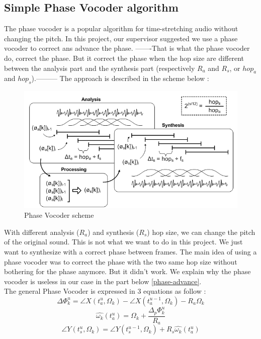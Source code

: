 \documentclass[]{article}
\begin{document}
\subsection{Simple Phase Vocoder algorithm}
The phase vocoder is a popular algorithm for time-stretching audio without changing the pitch. In this project, our supervisor suggested we use a phase vocoder to correct ans advance the phase. -------That is what the phase vocoder do, correct the phase. But it correct the phase when the hop size are different between the analysis part and the synthesis part (respectively $R_a$ and $R_s$, or $hop_a$ and $hop_s$).---------
The approach is described in the scheme below : 
\begin{figure}[H]
	\centering
	\includegraphics[scale = 0.6]{pvoverview.png}
	\caption{Phase Vocoder scheme}
\end{figure}
With different analysis ($R_a$) and synthesis ($R_s$) hop size, we can change the pitch of the original sound. This is not what we want to do in this project. We just want to synthesize with a correct phase between frames. The main idea of using a phase vocoder was to correct the phase with the two same hop size without bothering for the phase anymore. But it didn't work. We explain why the phase vocoder is useless in our case in the part below \ref{phase-advance}.\\
The general Phase Vocoder is expressed in 3 equations as follow :
\begin{equation}\label{eq1}
\Delta \Phi_{k}^{u} = \angle X(t_a^u, \Omega_k) - \angle X(t_a^{u-1}, \Omega_k) - R_a \Omega_k
\end{equation}
\begin{equation}\label{eq2}
\hat{\omega_k}(t_a^u) = \Omega_k + \frac{\Delta_p \Phi_{k}^u}{R_a}
\end{equation}
\begin{equation}\label{eq3}
\angle Y(t_s^u, \Omega_k) = \angle Y(t_s^{u-1}, \Omega_k) + R_s \hat{\omega_k}(t_a^u)
\end{equation}
\end{document}
